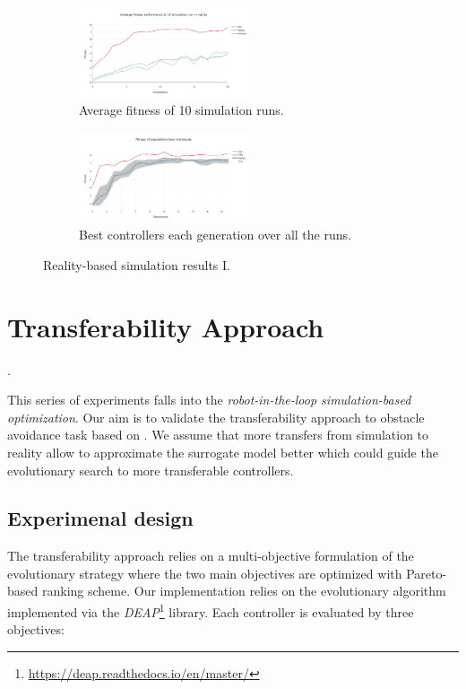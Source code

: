 \begin{figure}[H]
    \centering
    \begin{subfigure}[b]{0.8\textwidth}
    	\centering
        \includegraphics[width=5cm]{include/images/real_avg_fitness.PNG}
        \caption{Average fitness of 10 simulation runs.}
        \label{fig:real_avg_fitness}
    \end{subfigure}
    \begin{subfigure}[b]{0.8\textwidth}
    	\centering
        \includegraphics[width=5cm]{include/images/real_best_genomes_percentile.PNG}
        \caption{Best controllers each generation over all the runs.}
        \label{fig:real_best_genomes_percentile}
    \end{subfigure}
    \caption{Reality-based simulation results I.}
	\label{fig:real_based_resultsI}
\end{figure}

\section{Transferability Approach}.

This series of experiments falls into the \emph{robot-in-the-loop simulation-based optimization}. Our aim is to validate the transferability approach to obstacle avoidance task based on \citep{koos2012transferability}. We assume that more transfers from simulation to reality allow to approximate the surrogate model better which could guide the evolutionary search to more transferable controllers.

\subsection{Experimenal design}

The transferability approach relies on a multi-objective formulation of the evolutionary strategy where the two main objectives are optimized with Pareto-based ranking scheme. Our implementation relies on the \citep{deb200fast} evolutionary algorithm implemented via the \emph{DEAP}\footnote{\url{https://deap.readthedocs.io/en/master/}} library. Each controller is evaluated by three objectives:

